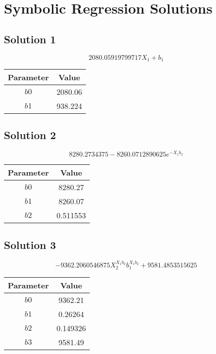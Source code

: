 \documentclass{article}
\begin{document}
        \section*{Symbolic Regression Solutions}
        \subsection*{Solution 1}
\[
2080.05919799717 X_{1} + b_{1}
\]
\begin{center}
\begin{tabular}{cc}
\toprule
Parameter & Value \\
\midrule
$b0$ & 2080.06 \\
$b1$ & 938.224 \\
\bottomrule
\end{tabular}
\end{center}

\vspace{1em}
\subsection*{Solution 2}
\[
8280.2734375 - 8260.0712890625 e^{- X_{1} b_{2}}
\]
\begin{center}
\begin{tabular}{cc}
\toprule
Parameter & Value \\
\midrule
$b0$ & 8280.27 \\
$b1$ & 8260.07 \\
$b2$ & 0.511553 \\
\bottomrule
\end{tabular}
\end{center}

\vspace{1em}
\subsection*{Solution 3}
\[
- 9362.2060546875 X_{2}^{X_{1} b_{2}} b_{1}^{X_{1} b_{2}} + 9581.4853515625
\]
\begin{center}
\begin{tabular}{cc}
\toprule
Parameter & Value \\
\midrule
$b0$ & 9362.21 \\
$b1$ & 0.26264 \\
$b2$ & 0.149326 \\
$b3$ & 9581.49 \\
\bottomrule
\end{tabular}
\end{center}
\end{document}
